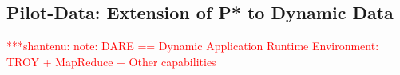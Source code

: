 \documentclass[conference,final]{IEEEtran}
\newcommand{\jhanote}[1]{ {\textcolor{red} { ***shantenu: #1 }}}
\newcommand{\alnote}[1]{ {\textcolor{blue} { ***andre: #1 }}}
\newcommand{\alnote}[1]{}
\newcommand{\jhanote}[1]{}
\begin{document}






\subsection{Pilot-Data: Extension of P* to Dynamic Data}
\label{sec:pilot-data}


\jhanote{note: DARE == Dynamic Application Runtime Environment: TROY +
  MapReduce + Other capabilities}
\end{document}
